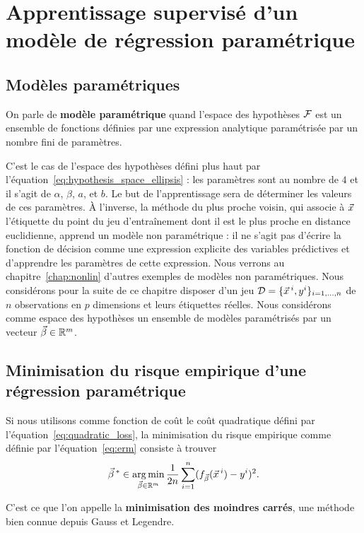 \section{Apprentissage supervisé d'un modèle de régression paramétrique}
\label{sec:parametric}
\subsection{Modèles paramétriques}
On parle de \textbf{modèle paramétrique} quand l'espace des hypothèses $\mathcal{F}$
est un ensemble de fonctions définies par une expression analytique
paramétrisée par un nombre fini de paramètres. 

C'est le cas de l'espace des hypothèses défini plus haut par
l'équation~\eqref{eq:hypothesis_space_ellipsis} : les paramètres sont au nombre
de $4$ et il s'agit de $\alpha$, $\beta$, $a$, et $b$. Le but de
l'apprentissage sera de déterminer les valeurs de ces paramètres.  À l'inverse,
la méthode du plus proche voisin, qui associe à $\xx$ l'étiquette du point du
jeu d'entraînement dont il est le plus proche en distance euclidienne, apprend
un modèle non paramétrique : il ne s'agit pas d'écrire la fonction de décision
comme une expression explicite des variables prédictives et d'apprendre les
paramètres de cette expression. Nous verrons au chapitre~\ref{chap:nonlin}
d'autres exemples de modèles non paramétriques.
Nous considérons pour la suite de ce chapitre disposer d'un jeu
$\DD = \{\xx^i, y^i\}_{i=1, \dots, n}$ de $n$ observations en $p$ dimensions et
leurs étiquettes réelles. Nous considérons comme espace des hypothèses un
ensemble de modèles paramétrisés par un vecteur $\bbeta \in \mathbb{R}^{m}$.


\subsection{Minimisation du risque empirique d'une régression paramétrique}
Si nous utilisons comme fonction de coût le coût quadratique défini par
l'équation~\eqref{eq:quadratic_loss}, la minimisation du risque empirique comme
définie par l'équation~\eqref{eq:erm} consiste à trouver
\begin{equation}
  \label{eq:erm_parametric}
  \bbeta^* \in \argmin_{\bbeta \in \RR^m} \frac{1}{2n} \sum_{i=1}^n (f_{\bbeta}(\xx^i) - y^i)^2.
\end{equation}

C'est ce que l'on appelle la \textbf{minimisation des moindres carrés}, une
méthode bien connue depuis Gauss et Legendre. 


